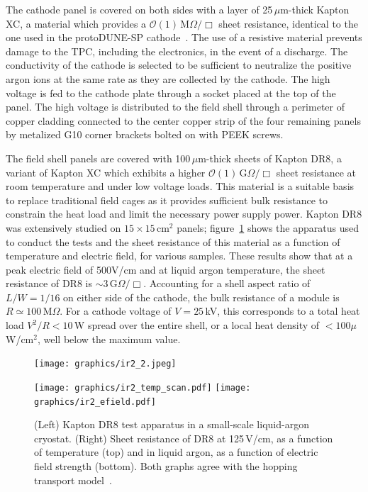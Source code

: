 The cathode panel is covered on both sides with a layer of 25\,$\mu$m-thick Kapton XC, a material which provides a $\mathcal{O}(1)\,$M$\Omega/\Box$ sheet resistance, identical to the one used in the protoDUNE-SP cathode~\cite{protodune-sp_tdr}. The use of a resistive material prevents damage to the TPC, including the electronics, in the event of a discharge. The conductivity of the cathode is selected to be sufficient to neutralize the positive argon ions at the same rate as they are collected by the cathode. The high voltage is fed to the cathode plate through a socket placed at the top of the panel. The high voltage is distributed to the field shell through a perimeter of copper cladding connected to the center copper strip of the four remaining panels by metalized G10 corner brackets bolted on with PEEK screws.

The field shell panels are covered with 100\,$\mu$m-thick sheets of Kapton DR8, a variant of Kapton XC which exhibits a higher $\mathcal{O}(1)\,$G$\Omega/\Box$ sheet resistance at room temperature and under low voltage loads. This material is a suitable basis to replace traditional field cages as it provides sufficient bulk resistance to constrain the heat load and limit the necessary power supply power. Kapton DR8 was extensively studied on $15\times15$\,cm$^2$ panels; figure~\ref{fig:dr8_studies} shows the apparatus used to conduct the tests and the sheet resistance of this material as a function of temperature and electric field, for various samples. These results show that at a peak electric field of 500V/cm and at liquid argon temperature, the sheet resistance of DR8 is $\sim3\,$G$\Omega/\Box$. Accounting for a shell aspect ratio of $L/W=1/16$ on either side of the cathode, the bulk resistance of a module is $R\simeq100$\,M$\Omega$. For a cathode voltage of $V=25$\,kV, this corresponds to a total heat load $V^2/R<10$\,W spread over the entire shell, or a local heat density of $<100\mu$W/cm$^2$, well below the maximum value.

\begin{figure}[htbp]
\centering
\begin{minipage}[b]{.295\textwidth}
\texttt{[image: graphics/ir2\_2.jpeg]}
\vspace{2mm}
\end{minipage}
\qquad
\begin{minipage}[b]{.4\textwidth}
\texttt{[image: graphics/ir2\_temp\_scan.pdf]}
\texttt{[image: graphics/ir2\_efield.pdf]}
\end{minipage}
\caption{(Left) Kapton DR8 test apparatus in a small-scale liquid-argon cryostat. (Right) Sheet resistance of DR8 at 125\,V/cm, as a function of temperature (top) and in liquid argon, as a function of electric field strength (bottom). Both graphs agree with the hopping transport model~\cite{hopping_transport}.}
\label{fig:dr8_studies}
\end{figure}

